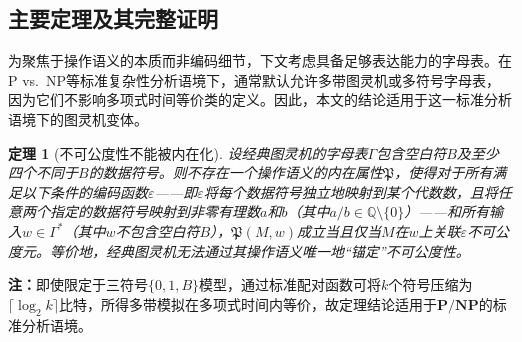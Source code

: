 \documentclass{ctexart}
\newtheorem{theorem}{定理}[section]
\begin{document}
	\subsection{主要定理及其完整证明}
	
	为聚焦于操作语义的本质而非编码细节，下文考虑具备足够表达能力的字母表。在P vs.\ NP等标准复杂性分析语境下，通常默认允许多带图灵机或多符号字母表，因为它们不影响多项式时间等价类的定义。因此，本文的结论适用于这一标准分析语境下的图灵机变体。
	
	\begin{theorem}[不可公度性不能被内在化]\label{thm:main}
		设经典图灵机的字母表$\Gamma$包含空白符$B$及至少四个不同于$B$的数据符号。则不存在一个操作语义的内在属性$\mathfrak{P}$，使得对于所有满足以下条件的编码函数$\varepsilon$——即$\varepsilon$将每个数据符号独立地映射到某个代数数，且将任意两个指定的数据符号映射到非零有理数$a$和$b$（其中$a/b \in \mathbb{Q} \setminus \{0\}$）——和所有输入$w \in \Gamma^*$（其中$w$不包含空白符$B$），$\mathfrak{P}(M, w)$成立当且仅当$M$在$w$上关联$\varepsilon$不可公度元。等价地，经典图灵机无法通过其操作语义唯一地``锚定''不可公度性。
	\end{theorem}
	
	\noindent\textbf{注：}即使限定于三符号$\{0,1,B\}$模型，通过标准配对函数可将$k$个符号压缩为$\lceil\log_2 k\rceil$比特，所得多带模拟在多项式时间内等价，故定理结论适用于$\mathbf{P}/\mathbf{NP}$的标准分析语境。
	
\end{document}
